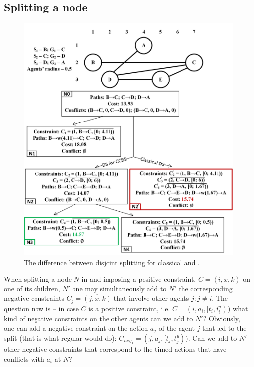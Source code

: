 
\subsection{Splitting a node}

\begin{figure}
    \centering
    \includegraphics[width=\columnwidth]{Example1.png}
    \caption{The difference between disjoint splitting for classical \mapf and \mapfr.}
    \label{fig:ds_for_ccbs}
\end{figure}


When splitting a \ct node $N$ in \cbsds and imposing a positive constraint, $C=(i, x, k)$ on one of its children, $N'$ one may simultaneously add to $N'$ the corresponding negative constraints $C_j=\overline{(j, x, k)}$ that involve other agents $j: j \neq i$. The question now is -- in case $C$ is a \ccbs positive constraint, i.e. $C=(i, a_i, [t_i, t_i^u))$ what kind of negative constraints on the other agents can we add to $N'$? Obviously, one can add a negative constraint on the action $a_j$ of the agent $j$ that led to the split (that is what regular \ccbs would do): $C_{neg_1}=(j, a_j, [t_j, t_j^u))$.  Can we add to $N'$ other negative constraints that correspond to the timed actions that have conflicts with $a_i$ at $N$? 

